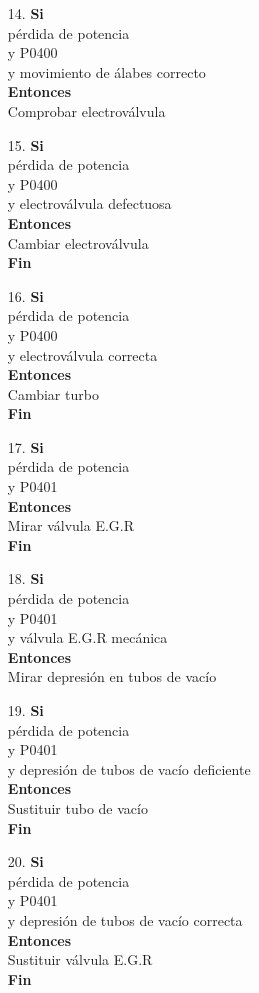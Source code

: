 \documentclass[a4paper,12pt]{article}
\newcommand\tab[1][1cm]{\hspace*{#1}}
\begin{document}
\begin{itemize}
\item[14.]\textbf{Si}\\ \tab pérdida de potencia\\ \tab y P0400\\ \tab y movimiento de álabes correcto\\ \textbf{Entonces}\\ \tab Comprobar electroválvula
\item[15.]\textbf{Si}\\ \tab pérdida de potencia\\ \tab y P0400\\ \tab y electroválvula defectuosa\\\textbf{Entonces}\\ \tab Cambiar electroválvula\\ \tab \textbf{Fin}
\item[16.]\textbf{Si}\\ \tab pérdida de potencia\\ \tab y P0400\\ \tab y electroválvula correcta\\\textbf{Entonces}\\ \tab Cambiar turbo\\ \tab \textbf{Fin}
\item[17.]\textbf{Si}\\ \tab pérdida de potencia\\ \tab y P0401\\ \textbf{Entonces}\\ \tab Mirar válvula E.G.R\\ \tab \textbf{Fin}
\item[18.]\textbf{Si}\\ \tab pérdida de potencia\\ \tab y P0401\\ \tab y válvula E.G.R mecánica\\  \textbf{Entonces}\\ \tab Mirar depresión en tubos de vacío
\item[19.]\textbf{Si}\\ \tab pérdida de potencia\\ \tab y P0401\\ \tab y depresión de tubos de vacío deficiente\\ \textbf{Entonces}\\ \tab Sustituir tubo de vacío\\ \tab \textbf{Fin}
\item[20.]\textbf{Si}\\ \tab pérdida de potencia\\ \tab y P0401\\ \tab y depresión de tubos de vacío correcta\\ \textbf{Entonces}\\ \tab Sustituir válvula E.G.R\\ \tab \textbf{Fin}

\end{itemize}
\end{document}
